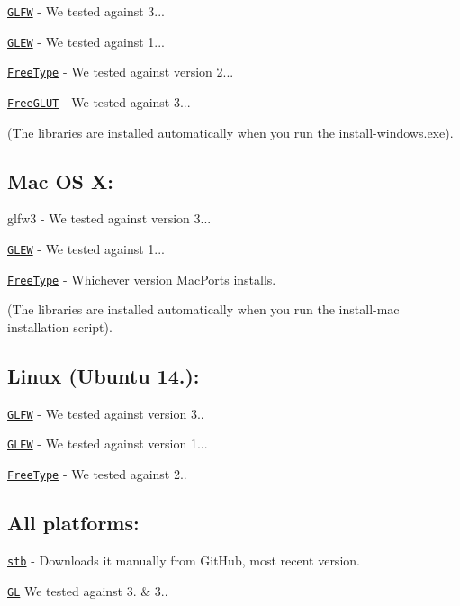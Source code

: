 \href{https://github.com/glfw/glfw/releases/download/3.1.1/glfw-3.1.1.zip}{\tt G\+L\+F\+W} -\/ We tested against 3...

\href{http://downloads.sourceforge.net/project/glew/glew/1.12.0/glew-1.12.0.zip}{\tt G\+L\+E\+W} -\/ We tested against 1...

\href{http://downloads.sourceforge.net/project/gnuwin32/freetype/2.3.5-1/freetype-2.3.5-1-bin.zip}{\tt Free\+Type} -\/ We tested against version 2...

\href{http://downloads.sourceforge.net/project/freeglut/freeglut/3.0.0/freeglut-3.0.0.tar.gz}{\tt Free\+G\+L\+U\+T} -\/ We tested against 3...

(The libraries are installed automatically when you run the install-\/windows.\+exe).

\subsection*{Mac O\+S X\+:}

glfw3 -\/ We tested against version 3...

\href{http://downloads.sourceforge.net/project/glew/glew/1.12.0/glew-1.12.0.zip}{\tt G\+L\+E\+W} -\/ We tested against 1...

\href{http://downloads.sourceforge.net/project/gnuwin32/freetype/2.3.5-1/freetype-2.3.5-1-bin.zip}{\tt Free\+Type} -\/ Whichever version Mac\+Ports installs.

(The libraries are installed automatically when you run the install-\/mac installation script).

\subsection*{Linux (Ubuntu 14.)\+:}

\href{http://www.glfw.org/download.html}{\tt G\+L\+F\+W} -\/ We tested against version 3..

\href{http://glew.sourceforge.net/}{\tt G\+L\+E\+W} -\/ We tested against version 1...

\href{http://www.freetype.org/download.html}{\tt Free\+Type} -\/ We tested against 2..

\subsection*{All platforms\+:}

\href{https://github.com/nothings/stb/archive/master.zip}{\tt stb} -\/ Downloads it manually from Git\+Hub, most recent version.

\href{https://www.opengl.org/}{\tt G\+L} We tested against 3. \& 3.. 